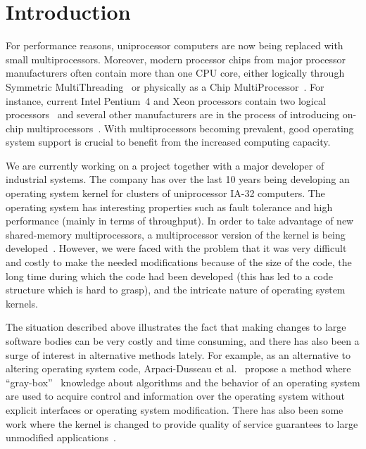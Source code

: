 
\section{Introduction}

For performance reasons, uniprocessor computers are now being replaced with
small multiprocessors. Moreover, modern processor chips from major processor
manufacturers often contain more than one CPU core, either logically through
Symmetric MultiThreading~\cite{eggers97simultaneous} or physically as a Chip
MultiProcessor~\cite{hammond97singlechip}.  For instance, current Intel
Pentium~4 and Xeon processors contain two logical
processors~\cite{marr02hyperthreading} and several other manufacturers are in
the process of introducing on-chip
multiprocessors~\cite{kahle99power4,spracklen05cmt}. With multiprocessors
becoming prevalent, good operating system support is crucial to benefit from
the increased computing capacity.

We are currently working on a project together with a major developer of
industrial systems. The company has over the last 10 years being developing an
operating system kernel for clusters of uniprocessor IA-32 computers. The
operating system has interesting properties such as fault tolerance and high
performance (mainly in terms of throughput). In order to take advantage of new
shared-memory multiprocessors, a multiprocessor version of the kernel is being
developed~\cite{kagstrom05experiences}.  However, we were faced with the
problem that it was very difficult and costly to make the needed modifications
because of the size of the code, the long time during which the code had been
developed (this has led to a code structure which is hard to grasp), and the
intricate nature of operating system kernels.

The situation described above illustrates the fact that making changes to
large software bodies can be very costly and time consuming, and there has
also been a surge of interest in alternative methods lately. For example, as
an alternative to altering operating system code, Arpaci-Dusseau et
al.~\cite{arpacidusseau01information} propose a method where ``gray-box''~
knowledge about algorithms and the behavior of an operating system are used to
acquire control and information over the operating system without explicit
interfaces or operating system modification. There has also been some work
where the kernel is changed to provide quality of service guarantees to large
unmodified applications~\cite{zhang03qos}.

